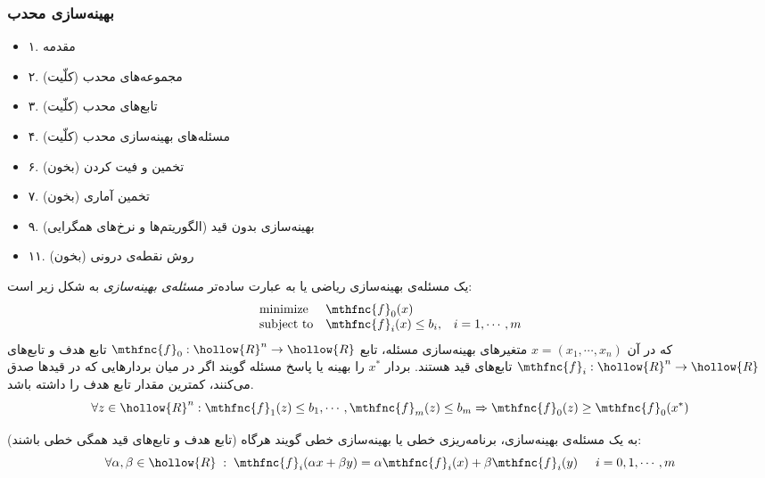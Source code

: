 
\subsubsection{
بهینه‌سازی محدب
\cite{convexoptimization}
}


\begin{itemize}
\item
۱. مقدمه
\item
۲. مجموعه‌های محدب (کلّیت)
\item
۳. تابع‌های محدب (کلّیت)
\item
۴. مسئله‌های بهینه‌سازی محدب (کلّیت)
\item
۶. تخمین و فیت کردن (بخون)
\item
۷. تخمین آماری (بخون)
\item
۹. بهینه‌سازی بدون قید (الگوریتم‌ها و نرخ‌های همگرایی)
\item
۱۱. روش نقطه‌ی درونی (بخون)

\end{itemize}


یک مسئله‌ی بهینه‌سازی ریاضی یا به عبارت ساده‌تر 
\emph{
مسئله‌ی بهینه‌سازی
} 
به شکل زیر است:
\[
\begin{array}{lll}
\mbox{minimize} & \mthfnc{f}_0(x) & \\
\mbox{subject to} & \mthfnc{f}_i(x) \leq b_i, & i = 1, \cdots, m
\end{array}
\]
که در آن 
$x = (x_1, \cdots, x_n)$ 
متغیرهای بهینه‌سازی مسئله، تابع 
$\mthfnc{f}_0: \hollow{R}^n \rightarrow \hollow{R}$ 
تابع هدف
و تابع‌های 
$\mthfnc{f}_i: \hollow{R}^n \rightarrow \hollow{R}$ 
تابع‌های قید
هستند. بردار 
$x^*$ 
را بهینه
یا پاسخ مسئله گویند اگر در میان بردارهایی که در قید‌ها صدق می‌کنند، کمترین مقدار تابع هدف را داشته باشد.
\[
\forall z \in \hollow{R}^n: \mthfnc{f}_1(z) \leq b_1 , \cdots, \mthfnc{f}_m(z) \leq b_m \Rightarrow \mthfnc{f}_0(z) \geq \mthfnc{f}_0(x^*)
\]

به یک مسئله‌ی بهینه‌سازی، برنامه‌ریزی خطی
یا بهینه‌سازی خطی
گویند هرگاه (تابع هدف و تابع‌های قید همگی خطی باشند):
\[
\forall \alpha,\beta \in \hollow{R} \; : \; \mthfnc{f}_i( \alpha x + \beta y ) = \alpha \mthfnc{f}_i(x) + \beta \mthfnc{f}_i(y) \hspace{5mm} i = 0,1,\cdots,m
\]

